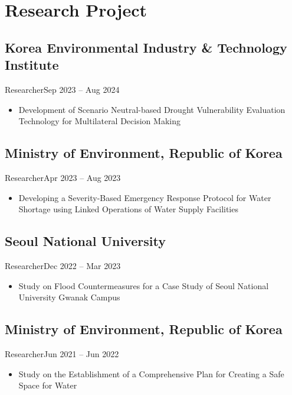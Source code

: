 \section{Research Project}
\subsection{Korea Environmental Industry \& Technology Institute}{Researcher}{Sep 2023 -- Aug 2024}
\begin{itemize}
    \item Development of Scenario Neutral-based Drought Vulnerability Evaluation Technology for Multilateral Decision Making 
\end{itemize}

\subsection{Ministry of Environment, Republic of Korea}{Researcher}{Apr 2023 -- Aug 2023}
\begin{itemize}
    \item Developing a Severity-Based Emergency Response Protocol for Water Shortage using Linked Operations of Water Supply Facilities   
\end{itemize}

\subsection{Seoul National University}{Researcher}{Dec 2022 -- Mar 2023}
\begin{itemize}
    \item Study on Flood Countermeasures for a Case Study of Seoul National University Gwanak
Campus
\end{itemize}

\subsection{Ministry of Environment, Republic of Korea}{Researcher}{Jun 2021 -- Jun 2022}
\begin{itemize}
    \item Study on the Establishment of a Comprehensive Plan for Creating a Safe Space for Water
\end{itemize}